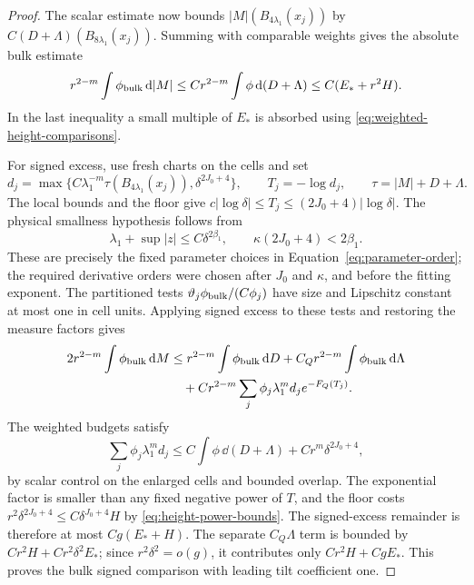\begin{proof}
The scalar estimate now bounds $|M|(B_{4\lambda_1}(x_j))$ by
$C(D+\Lambda)(B_{8\lambda_1}(x_j))$. Summing with comparable
weights gives the absolute bulk estimate
\begin{equation}\label{eq:bulk-absolute}
 r^{2-m}\int\phi_{\rm bulk}\,\mathrm d|M|
 \le Cr^{2-m}\int\phi\,\mathrm d(D+\Lambda)
 \le C(E_*+r^2H).
\end{equation}
In the last inequality a small multiple of $E_*$ is absorbed using
\eqref{eq:weighted-height-comparisons}.

For signed excess, use fresh charts on the cells and set
\[
 d_j=\max\{C\lambda_1^{-m}\tau(B_{4\lambda_1}(x_j)),
                          \delta^{2J_0+4}\},
 \qquad T_j=-\log d_j,\qquad \tau=|M|+D+\Lambda.
\]
The local bounds and the floor give
$c|\log\delta|\le T_j\le(2J_0+4)|\log\delta|$.
The physical smallness hypothesis follows from
\[
 \lambda_1+\sup|z|\le C\delta^{2\beta_1},
 \qquad \kappa(2J_0+4)<2\beta_1.
\]
These are precisely the fixed parameter choices in
Equation~\eqref{eq:parameter-order}; the required derivative orders
were chosen after $J_0$ and $\kappa$, and before the fitting exponent.
The partitioned tests $\vartheta_j\phi_{\rm bulk}/(C\phi_j)$ have
size and Lipschitz constant at most one in cell units. Applying signed
excess to these tests and restoring the measure factors gives
\begin{align*}
 2r^{2-m}\int\phi_{\rm bulk}\,\mathrm d M
 &\le r^{2-m}\int\phi_{\rm bulk}\,\mathrm d D
     +C_Qr^{2-m}\int\phi_{\rm bulk}\,\mathrm d\Lambda\\
 &\quad+Cr^{2-m}\sum_j\phi_j\lambda_1^m d_j e^{-F_Q(T_j)}.
\end{align*}
The weighted budgets satisfy
\[
 \sum_j\phi_j\lambda_1^m d_j
 \le C\int\phi\,\dd(D+\Lambda)+Cr^m\delta^{2J_0+4},
\]
by scalar control on the enlarged cells and bounded overlap. The
exponential factor is smaller than any fixed negative power of $T$,
and the floor costs
$r^2\delta^{2J_0+4}\le C\delta^{J_0+4}H$ by
\eqref{eq:height-power-bounds}. The signed-excess remainder is therefore at most
$Cg(E_*+H)$. The separate $C_Q\Lambda$ term is bounded by
$Cr^2H+Cr^2\delta^2E_*$; since $r^2\delta^2=o(g)$, it contributes
only $Cr^2H+CgE_*$. This proves the bulk signed comparison with
leading tilt coefficient one.


\end{proof}
